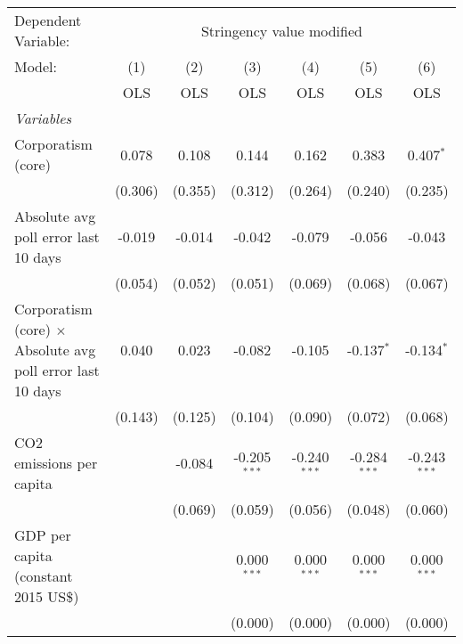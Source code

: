
\begingroup
\centering
\begin{tabular}{lcccccc}
   \toprule
   Dependent Variable: & \multicolumn{6}{c}{Stringency value modified}\\
   Model:                                                            & (1)     & (2)     & (3)            & (4)            & (5)            & (6)\\  
                                                                     &  OLS    & OLS     & OLS            & OLS            & OLS            & OLS\\  
   \midrule
   \emph{Variables}\\
   Corporatism (core)                                                & 0.078   & 0.108   & 0.144          & 0.162          & 0.383          & 0.407$^{*}$\\   
                                                                     & (0.306) & (0.355) & (0.312)        & (0.264)        & (0.240)        & (0.235)\\   
   Absolute avg poll error last 10 days                              & -0.019  & -0.014  & -0.042         & -0.079         & -0.056         & -0.043\\   
                                                                     & (0.054) & (0.052) & (0.051)        & (0.069)        & (0.068)        & (0.067)\\   
   Corporatism (core) $\times$ Absolute avg poll error last 10 days  & 0.040   & 0.023   & -0.082         & -0.105         & -0.137$^{*}$   & -0.134$^{*}$\\   
                                                                     & (0.143) & (0.125) & (0.104)        & (0.090)        & (0.072)        & (0.068)\\   
   CO2 emissions per capita                                          &         & -0.084  & -0.205$^{***}$ & -0.240$^{***}$ & -0.284$^{***}$ & -0.243$^{***}$\\   
                                                                     &         & (0.069) & (0.059)        & (0.056)        & (0.048)        & (0.060)\\   
   GDP per capita (constant 2015 US\$)                               &         &         & 0.000$^{***}$  & 0.000$^{***}$  & 0.000$^{***}$  & 0.000$^{***}$\\   
                                                                     &         &         & (0.000)        & (0.000)        & (0.000)        & (0.000)\\   

\end{tabular}
